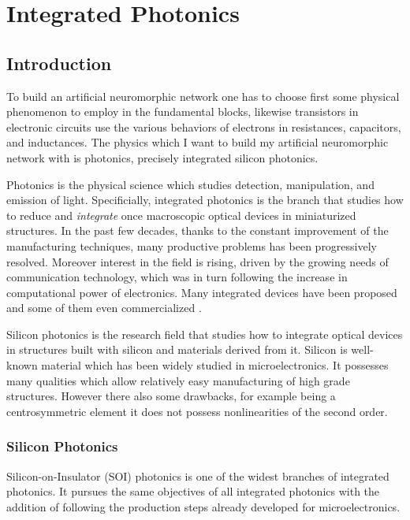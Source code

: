 \chapter{Integrated Photonics}
\label{ch:Integrated_Photonics}

\section{Introduction}
\label{sec:Photonics_intro}
To build an artificial neuromorphic network one has to choose first some physical phenomenon to employ in the fundamental blocks, likewise transistors in electronic circuits use the various behaviors of electrons in resistances, capacitors, and inductances.
The physics which I want to build my artificial neuromorphic network with is photonics, precisely integrated silicon photonics.

Photonics is the physical science which studies detection, manipulation, and emission of light.
Specificially, integrated photonics is the branch that studies how to reduce and \textit{integrate} once macroscopic optical devices in miniaturized structures.
In the past few decades, thanks to the constant improvement of the manufacturing techniques, many productive problems has been progressively resolved.
Moreover interest in the field is rising, driven by the growing needs of communication technology, which was in turn following the increase in computational power of electronics.
Many integrated devices have been proposed \cite{??} and some of them even commercialized \cite{??} .

Silicon photonics is the research field that studies how to integrate optical devices in structures built with silicon and materials derived from it.
Silicon is well-known material which has been widely studied in microelectronics.
It possesses many qualities which allow relatively easy manufacturing of high grade structures.
However there also some drawbacks, for example being a centrosymmetric element it does not possess nonlinearities of the second order.


\subsection{Silicon Photonics}
\label{ssec:Silicon_Photonics}
Silicon-on-Insulator (SOI) photonics is one of the widest branches of integrated photonics.
It pursues the same objectives of all integrated photonics with the addition of following the production steps already developed for microelectronics.

